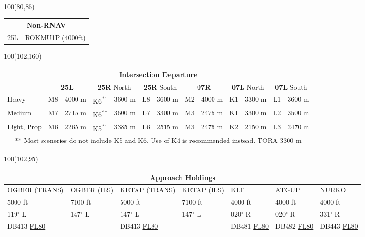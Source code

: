 \documentclass[10pt,landscape,a4paper]{article}
\begin{document}
\begin{textblock}{100}(80,85)
\begin{table}[]
\begin{tabular}{|l|l|}
\multicolumn{2}{c}{\textbf{Non-RNAV}} \\ \hline
25L  & ROKMU1P (4000ft)\\ \hline
\end{tabular}
\end{table}
\end{textblock}


\begin{textblock}{100}(102,160)
\begin{table}[]
\begin{tabular}{|l|l|l|l|l|l|l|l|l|l|l|l|l|}
\multicolumn{13}{c}{\textbf{Intersection Departure}} \\ \hline
 & \multicolumn{2}{c|}{\textbf{25L}} & \multicolumn{2}{c|}{\textbf{25R} North} & \multicolumn{2}{c|}{\textbf{25R} South}& \multicolumn{2}{c|}{\textbf{07R}} & \multicolumn{2}{c|}{\textbf{07L} North} & \multicolumn{2}{c|}{\textbf{07L} South} \\ \hline
Heavy & M8 & 4000 m & K6\textsuperscript{**} & 3600 m & L8 & 3600 m & M2 & 4000 m & K1 & 3300 m & L1 & 3600 m \\ \hline
Medium & M7 & 2715 m & K6\textsuperscript{**} & 3600 m & L7 & 3300 m & M3 & 2475 m & K1 & 3300 m & L2 & 3500 m \\ \hline
Light, Prop & M6 & 2265 m & K5\textsuperscript{**} & 3385 m & L6 & 2515 m & M3 & 2475 m & K2 & 2150 m & L3 & 2470 m \\ \hline
\multicolumn{13}{c}{** Most sceneries do not include K5 and K6. Use of K4 is recommended instead. TORA 3300 m} 
\end{tabular}
\end{table}
\end{textblock}



\begin{textblock}{100}(102,95)
\begin{table}[]
\begin{tabular}{|l|l|l|l|l|l|l|}
\multicolumn{7}{c}{\textbf{Approach Holdings}}\\ \hline
OGBER (TRANS)  			& OGBER (ILS)  		& KETAP (TRANS)  			& KETAP (ILS)    	& KLF  						& ATGUP    					& NURKO    					  \\ 
5000 ft  				& 7100 ft  			& 5000 ft  					& 7100 ft    		& 4000 ft  					& 4000 ft    				& 4000 ft    				 \\ 
119$^\circ$ L    		& 147$^\circ$ L    	& 147$^\circ$ L    			& 147$^\circ$ L    	& 020$^\circ$ R    			& 020$^\circ$ R    			& 331$^\circ$ R    			 \\
DB413 \underline{FL80}  &   				& DB413 \underline{FL80}   	&    				& DB481 \underline{FL80}   	& DB482 \underline{FL80}   	& DB443 \underline{FL80}   \\ \hline
\end{tabular}
\end{table}
\end{textblock}
\end{document}
